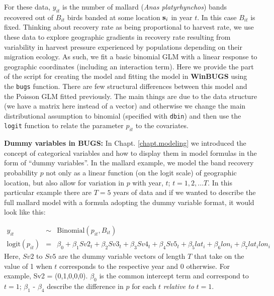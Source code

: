 For these data, $y_{it}$ is the number of mallard ({\it Anas platyrhynchos}) bands recovered out
of $B_{it}$ birds banded at some location ${\bf s}_{i}$ in year $t$. In this case $B_{it}$ is
fixed. Thinking about recovery rate as being proportional to harvest
rate, we use these data to explore geographic gradients in recovery rate
resulting from variability in harvest pressure experienced by
populations depending on their migration ecology. As such, we fit a
basic binomial GLM with a linear response to geographic coordinates
(including an interaction term). 
Here we
 provide the part of the script for creating the model and fitting the
 model in
{\bf WinBUGS} using the \mbox{\tt bugs} function.
There are few structural differences between this model and the
Poisson GLM fitted previously. The main things are due to the data
structure (we have a matrix here instead of a vector) and otherwise we
change the main distributional assumption to binomial (specified with
\mbox{\tt dbin}) and then use the \mbox{\tt logit} function to relate
the parameter $p_{it}$ to the covariates.  

{\flushleft \bf Dummy variables in BUGS: } 
In Chapt. \ref{chapt.modeling} we introduced the concept of categorical variables and how to display them in model formulas in the form of ``dummy variables''. In the mallard example, we model the band recovery probability $p$ not only as a linear function (on the logit scale) of geographic location, but also allow for variation in $p$ with year, $t$; $t=1,2,...T$. In this particular example there are $T=5$ years of data and if we wanted to describe the full mallard model with a formula adopting the dummy variable format, it would look like this:

\begin{eqnarray*}
y_{it} &\sim & \mbox{Binomial}(p_{it}, B_{it}) \\
\mbox{logit}(p_{it}) &=& \beta_0 + \beta_1 Sv2_t + \beta_2 Sv3_t + \beta_3 Sv4_t + \beta_4 Sv5_t + \beta_5 lat_i + \beta_6 lon_i + \beta_7 lat_i lon_i
\end{eqnarray*}
Here, $Sv2$ to $Sv5$ are the dummy variable vectors of length $T$ that take on the value of 1 when $t$ corresponds to the respective year and 0 otherwise. For example, Sv2 = (0,1,0,0,0). $\beta_0$ is the common intercept term and correspond to $t=1$; $\beta_1$ - $\beta_4$ describe the difference in $p$ for each $t$ \emph{relative to} $t=1$.

